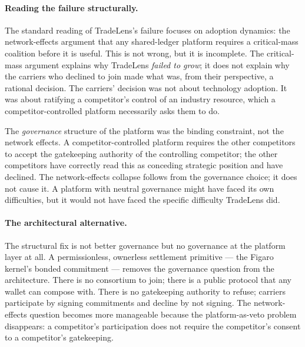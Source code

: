 \documentclass[11pt,a4paper]{article}
\theoremstyle{definition}
\theoremstyle{remark}
\begin{document}
\paragraph{Reading the failure structurally.}
The standard reading of TradeLens's failure focuses on adoption
dynamics: the network-effects argument that any shared-ledger
platform requires a critical-mass coalition before it is useful.
This is not wrong, but it is incomplete. The critical-mass argument
explains why TradeLens \emph{failed to grow}; it does not explain
why the carriers who declined to join made what was, from their
perspective, a rational decision. The carriers' decision was not
about technology adoption. It was about ratifying a competitor's
control of an industry resource, which a competitor-controlled
platform necessarily asks them to do.

The \emph{governance} structure of the platform was the binding
constraint, not the network effects. A competitor-controlled
platform requires the other competitors to accept the gatekeeping
authority of the controlling competitor; the other competitors
have correctly read this as conceding strategic position and have
declined. The network-effects collapse follows from the governance
choice; it does not cause it. A platform with neutral governance
might have faced its own difficulties, but it would not have faced
the specific difficulty TradeLens did.

\paragraph{The architectural alternative.}
The structural fix is not better governance but no governance at
the platform layer at all. A permissionless, ownerless settlement
primitive --- the Figaro kernel's bonded commitment --- removes the
governance question from the architecture. There is no consortium
to join; there is a public protocol that any wallet can compose
with. There is no gatekeeping authority to refuse; carriers
participate by signing commitments and decline by not signing. The
network-effects question becomes more manageable because the
platform-as-veto problem disappears: a competitor's participation
does not require the competitor's consent to a competitor's
gatekeeping.
\end{document}
